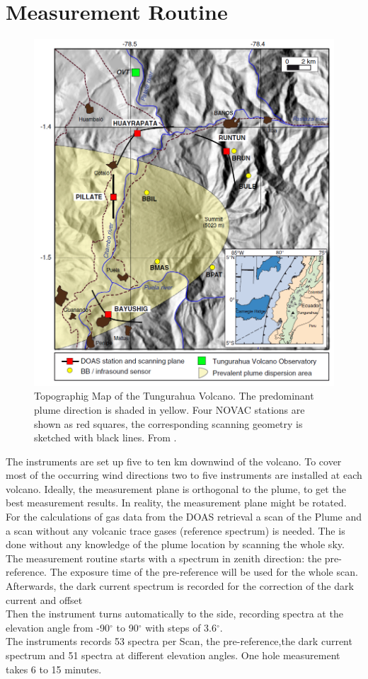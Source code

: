 		
		\section{Measurement Routine}
		\begin{figure}[h]
			\centering
			\includegraphics[width=0.6\linewidth]{Bilder/Simon/Bilder_Tung/Map_Tungurahua2}
			\caption{Topographig Map of the Tungurahua Volcano. The predominant plume direction is shaded in yellow.  Four NOVAC stations are shown as red squares, the corresponding scanning geometry is sketched with black lines. From \cite{hidalgo2015so2}.}
			\label{fig:maptungurahua2}
		\end{figure}
		The instruments are set up five to ten km downwind of the volcano. To cover most of the occurring wind directions two to five instruments are installed at each volcano. Ideally, the measurement plane is orthogonal to the plume, to get the best measurement results. In reality, the measurement plane might be rotated.\\
		
		For the calculations of gas data from the DOAS retrieval a scan of the Plume and a scan without any volcanic trace gases (reference spectrum) is needed.  The is done without any knowledge of the plume location by scanning the whole sky. 
		The measurement routine starts with a spectrum in zenith direction: the pre-reference. The exposure time of the pre-reference will be used for the whole scan.
		Afterwards, the dark current spectrum is recorded for the correction of the dark current and offset\\
		Then the instrument turns automatically to the side, recording spectra at the elevation angle from -90$^{\circ}$ to 90$^{\circ}$ with steps of 3.6$^{\circ}$. \\
		The instruments records 53 spectra per Scan, the pre-reference,the dark current spectrum and 51 spectra at different elevation angles.
		One hole measurement takes 6 to 15 minutes.